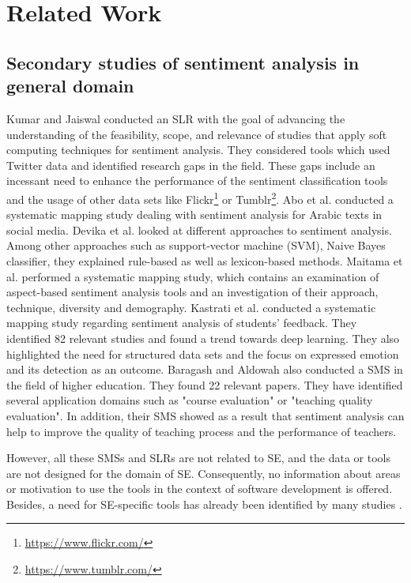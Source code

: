 \section{Related Work}
\label{sec:related}

\subsection{Secondary studies of sentiment analysis in general domain}
Kumar and Jaiswal \cite{Kumar.2020} conducted an SLR with the goal of advancing the understanding of the feasibility, scope, and relevance of studies that apply soft computing techniques for sentiment analysis. They considered tools which used Twitter data and identified research gaps in the field. These gaps include an incessant need to enhance the performance of the sentiment classification tools and the usage of other data sets like Flickr\footnote{\url{https://www.flickr.com/}} or Tumblr\footnote{\url{https://www.tumblr.com/}}.
Abo et al. \cite{Mohamed.2019} conducted a systematic mapping study dealing with sentiment analysis for Arabic texts in social media. Devika et al. \cite{Devika.2016} looked at different approaches to sentiment analysis. Among other approaches such as support-vector machine (SVM), Naive Bayes classifier, they explained rule-based as well as lexicon-based methods.
Maitama et al. \cite{Maitama.2020} performed a systematic mapping study, which contains an examination of aspect-based sentiment analysis tools and an investigation of their approach, technique, diversity and demography.
Kastrati et al. \cite{app11093986} conducted a systematic mapping study regarding sentiment analysis of students' feedback. They identified 82 relevant studies and found a trend towards deep learning. They also highlighted the need for structured data sets and the focus on expressed emotion and its detection as an outcome.
Baragash and Aldowah \cite{Baragash_2021} also conducted a SMS in the field of higher education. They found 22 relevant papers. They have identified several application domains such as "course evaluation" or "teaching quality evaluation". In addition, their SMS showed as a result that sentiment analysis can help to improve the quality of teaching process and the performance of teachers.

However, all these SMSs and SLRs are not related to SE, and the data or tools are not designed for the domain of SE. Consequently, no information about areas or motivation to use the tools in the context of software development is offered. Besides, a need for SE-specific tools has already been identified by many studies \cite{Ahmed.2017, Calefato.2018, Chen.2019, Ding.2018, Islam.2018, Imtiaz.2018, StackEmo, F.Calefato.2015, Umer.2020, Werner.2018}.

